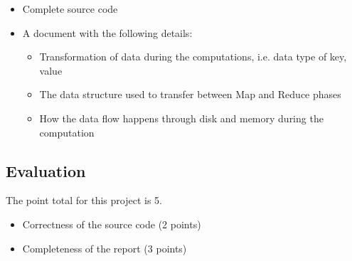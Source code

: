 \begin{itemize}
\item Complete source code
\item A document with the following details:

  \begin{itemize}
  \item	Transformation of data during the computations, i.e. data type of key, value
  \item	The data structure used to transfer between Map and Reduce phases
  \item	How the data flow happens through disk and memory during the computation
  \end{itemize}

\end{itemize}

\subsection*{Evaluation}

The point total for this project is 5.

\begin{itemize}
\item Correctness of the source code (2 points)
\item	Completeness of the report (3 points)
\end{itemize}


